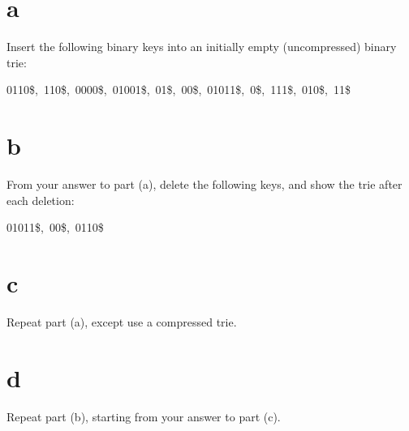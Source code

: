 \documentclass[12pt]{article}
\begin{document}
	\begin{enumerate}
		\part{a} Insert the following binary keys into an initially empty (uncompressed) binary trie:
		\begin{center}
			0110\$,\ 110\$,\ 0000\$,\ 01001\$,\ 01\$,\ 00\$,\ 01011\$,\ 0\$,\ 111\$,\ 010\$,\ 11\$
		\end{center}
		\part{b} From your answer to part (a), delete the following keys, and show the trie after each deletion:
		\begin{center}
			01011\$,\ 00\$,\ 0110\$ 
		\end{center}
		
		\part{c}  Repeat part (a), except use a compressed trie.
		
		\part{d}  Repeat part (b), starting from your answer to part (c).
	\end{enumerate}
	
\end{document}

